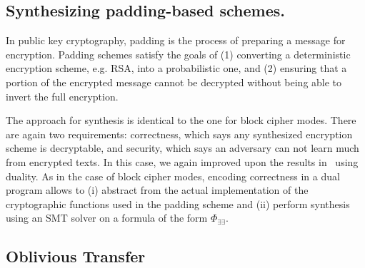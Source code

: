 \documentclass[preprint]{sig-alternate-05-2015}
\begin{document}
\subsection{Synthesizing padding-based schemes.}

In public key cryptography, padding is the process of preparing a
message for encryption.  %
Padding schemes %
satisfy the goals of (1) converting a deterministic
encryption scheme, e.g. RSA, into a probabilistic one, and (2)
ensuring that a portion of the encrypted message cannot be decrypted
without being able to invert the full encryption.


The approach for synthesis is identical to the one for block cipher modes.
There are again two requirements: 
correctness, which says any synthesized encryption scheme is decryptable,
and security, which says an adversary can not learn much from encrypted texts.
In this case, we again improved upon the results in~\cite{TGD15:CADE}
using duality. As in the case of
block cipher modes, encoding correctness in a dual program
allows to (i) abstract from the actual implementation of
the cryptographic functions used in the padding scheme and
(ii) perform synthesis using an SMT solver on a formula of the form $\Phi_{\exists\exists}$.




\subsection{Oblivious Transfer}
\end{document}
